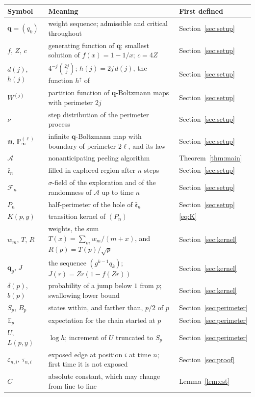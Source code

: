 \documentclass[11pt]{amsart}
\theoremstyle{remark}
\numberwithin{equation}{section}
\newcommand{\E}{\mathbb E}
\newcommand{\1}{\mathbf 1}
\newcommand{\F}{\mathcal F}
\begin{document}
\begin{center}
\small
\begin{tabular}{lp{}l}
Symbol & Meaning & First defined \\ \hline
$\mathbf q=(q_k)$ & weight sequence; admissible and critical throughout & Section~\ref{sec:setup} \\
$f$, $Z$, $c$ & generating function of $\mathbf q$; smallest solution of $f(x)=1-1/x$; $c=4Z$ & Section~\ref{sec:setup} \\
$d(j)$, $h(j)$ & $4^{-j}\binom{2j}{j}$; $h(j)=2j\,d(j)$, the function $h^\uparrow$ of \cite{Cur} & Section~\ref{sec:setup} \\
$W^{(j)}$ & partition function of $\mathbf q$-Boltzmann maps with perimeter $2j$ & Section~\ref{sec:setup} \\
$\nu$ & step distribution of the perimeter process & Section~\ref{sec:setup} \\
$\mathfrak m$, $\mathbb P^{(\ell)}_\infty$ & infinite $\mathbf q$-Boltzmann map with boundary of perimeter $2\ell$, and its law & Section~\ref{sec:setup} \\
$\mathcal A$ & nonanticipating peeling algorithm & Theorem~\ref{thm:main} \\
$\bar{\mathfrak e}_n$ & filled-in explored region after $n$ steps & Section~\ref{sec:setup} \\
$\F_n$ & $\sigma$-field of the exploration and of the randomness of $\mathcal A$ up to time $n$ & Section~\ref{sec:setup} \\
$P_n$ & half-perimeter of the hole of $\bar{\mathfrak e}_n$ & Section~\ref{sec:setup} \\
$K(p,y)$ & transition kernel of $(P_n)$ & \eqref{eq:K} \\
$w_m$, $T$, $R$ & weights, the sum $T(x)=\sum_m w_m/(m+x)$, and $R(p)=T(p)/\sqrt p$ & Section~\ref{sec:kernel} \\
$\mathbf q_g$, $J$ & the sequence $(g^{k-1}q_k)$; $J(r)=Zr(1-f(Zr))$ & Section~\ref{sec:kernel} \\
$\delta(p)$, $b(p)$ & probability of a jump below $1$ from $p$; swallowing lower bound & Section~\ref{sec:kernel} \\
$S_p$, $B_p$ & states within, and farther than, $p/2$ of $p$ & Section~\ref{sec:perimeter} \\
$\E_p$ & expectation for the chain started at $p$ & Section~\ref{sec:perimeter} \\
$U$, $L(p,y)$ & $\log h$; increment of $U$ truncated to $S_p$ & Section~\ref{sec:perimeter} \\
$\varepsilon_{n,i}$, $\tau_{n,i}$ & exposed edge at position $i$ at time $n$; first time it is not exposed & Section~\ref{sec:proof} \\
$C$ & absolute constant, which may change from line to line & Lemma~\ref{lem:est} \\
\end{tabular}
\end{center}
\end{document}
